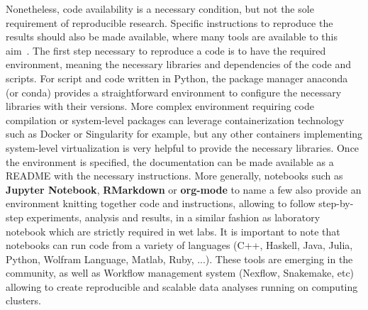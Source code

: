 Nonetheless, code availability is a necessary condition, but not the sole requirement of reproducible research.
Specific instructions to reproduce the results should also be made available, where many tools are available to this aim~\citep{Wilson2014,Darriba2018}.
The first step necessary to reproduce a code is to have the required environment, meaning the necessary libraries and dependencies of the code and scripts.
For script and code written in Python, the package manager anaconda (or conda) provides a straightforward environment to configure the necessary libraries with their versions. 
More complex environment requiring code compilation or system-level packages can leverage containerization technology such as Docker or Singularity for example, but any other containers implementing system-level virtualization is very helpful to provide the necessary libraries.
Once the environment is specified, the documentation can be made available as a README with the necessary instructions.
More generally, notebooks such as \textbf{Jupyter Notebook}, \textbf{RMarkdown} or \textbf{org-mode} to name a few also provide an environment knitting together code and instructions, allowing to follow step-by-step experiments, analysis and results, in a similar fashion as laboratory notebook which are strictly required in wet labs.
It is important to note that notebooks can run code from a variety of languages (C++, Haskell, Java, Julia, Python, Wolfram Language, Matlab, Ruby, ...).
These tools are emerging in the community, as well as Workflow management system (Nexflow, Snakemake, etc) allowing to create reproducible and scalable data analyses running on computing clusters.

